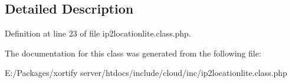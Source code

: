 \subsection{Detailed Description}


Definition at line 23 of file ip2locationlite.\-class.\-php.



The documentation for this class was generated from the following file\-:\begin{DoxyCompactItemize}
\item 
E\-:/\-Packages/xortify server/htdocs/include/cloud/inc/ip2locationlite.\-class.\-php\end{DoxyCompactItemize}
